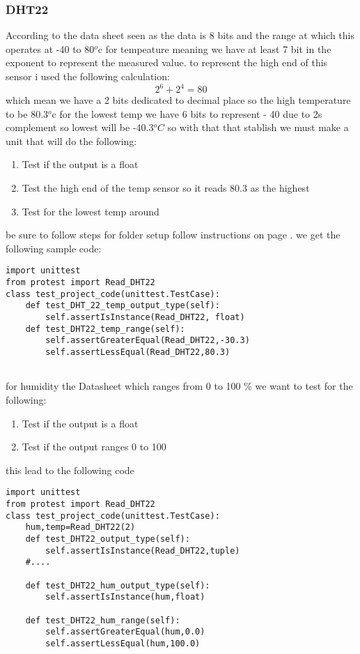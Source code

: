 \subsubsection{DHT22}
According to the  data sheet \cite{sparkfun} seen as  the data is   8 bits  and  the  range at which this   operates at  -40 to 80$^{o}$c for tempeature
meaning we have  at least  7 bit in the  exponent to  represent  the   measured value.
to represent  the  high  end of this  sensor i used the  following calculation:
$$ 2^6 +2^4 = 80$$ which mean  we have  a 2 bits dedicated to decimal place so the  high temperature to be 80.3$^{o}$c
for the  lowest temp we have 6 bits  to  represent  - 40 due to  2s complement  so lowest  will   be -40.3$^{o}C$
so with that  that  stablish we  must  make a  unit  that will do  the  following:
\begin{enumerate}
    \item Test if the  output is  a float
    \item Test the  high end of  the  temp sensor so it  reads  80.3 as  the highest
    \item Test for the  lowest   temp   around 
\end{enumerate}
be sure to follow  steps  for  folder  setup  follow instructions on page \pageref{folderstructure}.
we get the following sample code:
\begin{lstlisting}[style=mystyle,caption={sample test intial code}]
import unittest
from protest import Read_DHT22
class test_project_code(unittest.TestCase):
    def test_DHT_22_temp_output_type(self):
        self.assertIsInstance(Read_DHT22, float)
    def test_DHT22_temp_range(self):
        self.assertGreaterEqual(Read_DHT22,-30.3)
        self.assertLessEqual(Read_DHT22,80.3)
    
\end{lstlisting} 
for  humidity  the Datasheet which ranges from 0 to 100 \%
we want to test for the following:
\begin{enumerate}
    \item Test if the  output is  a float
    \item Test if the  output ranges 0 to 100
\end{enumerate}
this lead to the  following code 
\begin{lstlisting}[style=mystyle,caption={sample test for DHT22}]
import unittest
from protest import Read_DHT22
class test_project_code(unittest.TestCase):
    hum,temp=Read_DHT22(2)
    def test_DHT22_output_type(self):
        self.assertIsInstance(Read_DHT22,tuple)
    #....

    def test_DHT22_hum_output_type(self):
        self.assertIsInstance(hum,float)

    def test_DHT22_hum_range(self):
        self.assertGreaterEqual(hum,0.0)
        self.assertLessEqual(hum,100.0)
\end{lstlisting}
